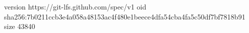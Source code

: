 version https://git-lfs.github.com/spec/v1
oid sha256:7b0211ccb3e4a058a48153ac4f480e1beece4dfa54cba4fa5c50df7bf7818b91
size 43840
